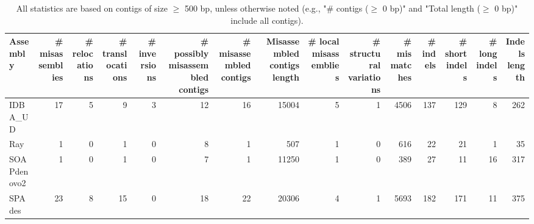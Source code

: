 \documentclass[12pt,a4paper]{article}
\begin{document}
\begin{table}[ht]
\begin{center}
\caption{All statistics are based on contigs of size $\geq$ 500 bp, unless otherwise noted (e.g., "\# contigs ($\geq$ 0 bp)" and "Total length ($\geq$ 0 bp)" include all contigs).}
\begin{tabular}{|l*{14}{|r}|}
\hline
Assembly & \# misassemblies &     \# relocations &     \# translocations &     \# inversions & \# possibly misassembled contigs & \# misassembled contigs & Misassembled contigs length & \# local misassemblies & \# structural variations & \# mismatches & \# indels &     \# short indels &     \# long indels & Indels length \\ \hline
IDBA\_UD & 17 & 5 & 9 & 3 & 12 & 16 & 15004 & 5 & 1 & 4506 & 137 & 129 & 8 & 262 \\ \hline
Ray & 1 & 0 & 1 & 0 & 8 & 1 & 507 & 1 & 0 & 616 & 22 & 21 & 1 & 35 \\ \hline
SOAPdenovo2 & 1 & 0 & 1 & 0 & 7 & 1 & 11250 & 1 & 0 & 389 & 27 & 11 & 16 & 317 \\ \hline
SPAdes & 23 & 8 & 15 & 0 & 18 & 22 & 20306 & 4 & 1 & 5693 & 182 & 171 & 11 & 375 \\ \hline
\end{tabular}
\end{center}
\end{table}
\end{document}
